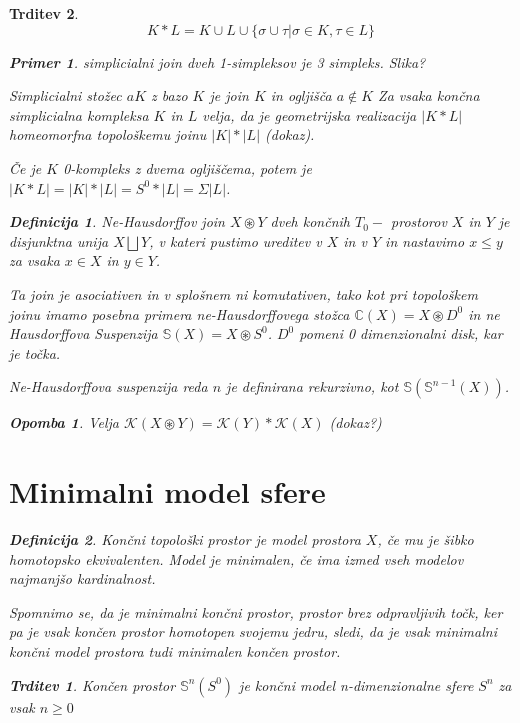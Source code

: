 \documentclass[a4paper,12pt]{article}
\DeclareRobustCommand{\k}{
    \mathcal{K}
}
\theoremstyle{definition}
\newtheorem{definicija}{Definicija}
\theoremstyle{plain}
\theoremstyle{definition}
\newtheorem{primer}{Primer}
\theoremstyle{plain}
\newtheorem{trditev}{Trditev}
\theoremstyle{plain}
\theoremstyle{plain}
\newtheorem{opomba}{Opomba}
\theoremstyle{plain}
\begin{document}
\begin{trditev}
$$
K\ast L=K\cup L \cup \{\sigma \cup \tau| \sigma \in K, \tau \in L \}
$$

\begin{primer}
    simplicialni join dveh 1-simpleksov je 3 simpleks. Slika?
\end{primer}

\textit{Simplicialni stožec} $aK$ z bazo $K$ je join $K$ in ogljišča $a\notin K$
Za vsaka končna simplicialna kompleksa $K$ in $L$ velja, da je geometrijska realizacija $|K\ast L|$ homeomorfna topološkemu joinu $|K|\ast |L|$ (dokaz).

Če je $K$ 0-kompleks z dvema ogljiščema, potem je $|K\ast L|=|K|\ast |L|=S^0\ast |L| = \Sigma |L|$.

\begin{definicija}
    \textit{Ne-Hausdorffov join} $X\circledast Y$ dveh končnih $T_0-$
    prostorov $X$ in $Y$ je disjunktna unija $X\bigsqcup Y$, v kateri
     pustimo ureditev v $X$ in v $Y$ in nastavimo $x\leq y$ za vsaka 
     $x\in X$ in $y\in Y$.
\end{definicija}
Ta join je asociativen in v splošnem ni komutativen, tako kot pri topološkem
 joinu imamo posebna primera ne-Hausdorffovega stožca $\mathds{C}(X)=X\circledast
  D^0$ in ne Hausdorffova Suspenzija $\mathds{S}(X)=X \circledast S^0$. 
  $D^0$ pomeni 0 dimenzionalni disk, kar je točka.

  Ne-Hausdorffova suspenzija reda $n$ je definirana rekurzivno, kot $\mathds{S}(\mathds{S}^{n-1}(X))$.
  \begin{opomba}
    \label{op:join}
    Velja $\k(X\circledast Y) = \k(Y)\ast \k(X)$ (dokaz?)
  \end{opomba}


\section{Minimalni model sfere}


\begin{definicija}
    Končni topološki prostor je \textit{model} prostora $X$, če mu je šibko homotopsko ekvivalenten. Model je \textit{minimalen}, če ima izmed vseh modelov najmanjšo kardinalnost.
\end{definicija}

Spomnimo se, da je minimalni končni prostor, prostor brez odpravljivih točk, ker pa je vsak končen prostor homotopen svojemu jedru, sledi, da je vsak minimalni končni model prostora tudi minimalen končen prostor.

\begin{trditev}
    Končen prostor $\mathds{S}^n(S^0)$ je končni model n-dimenzionalne sfere $S^n$ za vsak $n\geq 0$
\end{trditev}


\end{trditev}
\end{document}
